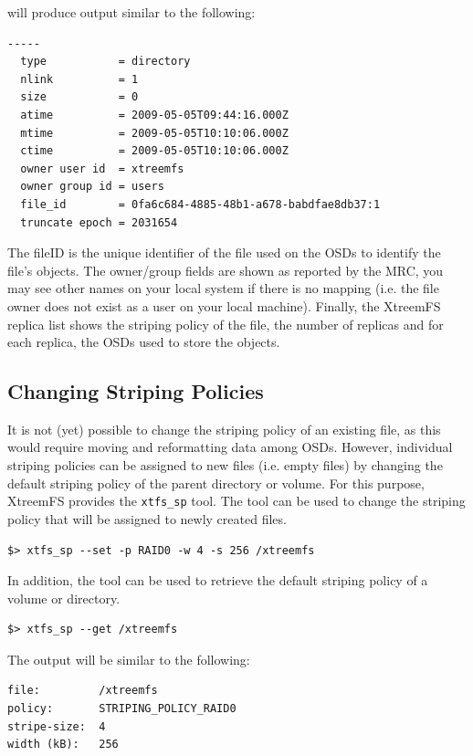 \documentclass[a4paper,10pt]{book}
\begin{document}
will produce output similar to the following:


\begin{verbatim}
-----
  type           = directory
  nlink          = 1
  size           = 0
  atime          = 2009-05-05T09:44:16.000Z
  mtime          = 2009-05-05T10:10:06.000Z
  ctime          = 2009-05-05T10:10:06.000Z
  owner user id  = xtreemfs
  owner group id = users
  file_id        = 0fa6c684-4885-48b1-a678-babdfae8db37:1
  truncate epoch = 2031654
\end{verbatim}


The fileID  is the unique identifier of the file used on the OSDs to identify the file's objects. The owner/group fields are shown as reported by the MRC, you may see other names on your local system if there is no mapping (i.e. the file owner does not exist as a user on your local machine).
Finally, the XtreemFS replica list shows the striping policy of the file, the number of replicas and for each replica, the OSDs used to store the objects.


\subsection{Changing Striping Policies}

It is not (yet) possible to change the striping policy of an existing file, as this would require moving and reformatting data among OSDs. However, individual striping policies can be assigned to new files (i.e. empty files) by changing the default striping policy of the parent directory or volume. For this purpose, XtreemFS provides the \texttt{xtfs\_sp} tool. The tool can be used to change the striping policy that will be assigned to newly created files.

\begin{verbatim}
$> xtfs_sp --set -p RAID0 -w 4 -s 256 /xtreemfs
\end{verbatim}

In addition, the tool can be used to retrieve the default striping policy of a volume or directory.

\begin{verbatim}
$> xtfs_sp --get /xtreemfs
\end{verbatim}

The output will be similar to the following:

\begin{verbatim}
file:         /xtreemfs
policy:       STRIPING_POLICY_RAID0
stripe-size:  4
width (kB):   256
\end{verbatim}
\end{document}
